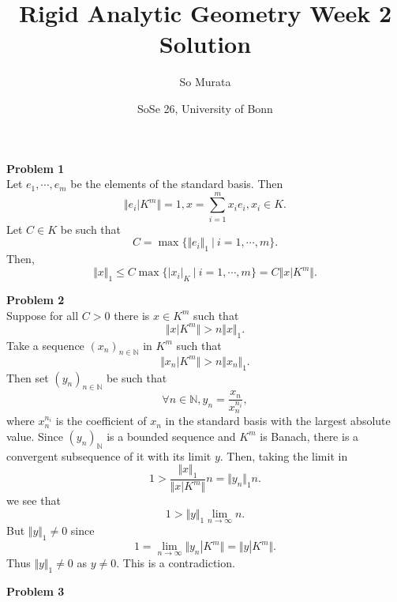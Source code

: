 \documentclass[10pt]{article}
\title{Rigid Analytic Geometry Week 2 Solution}
\author{So Murata}
\date{SoSe 26, University of Bonn}
\newcommand{\norm}[1]{\Vert #1 \Vert}
\newcommand{\N}[0]{\mathbb{N}}
\newcommand{\sep}[0]{\:|\:}
\newcommand{\ab}[1]{\vert #1 \vert}
\begin{document}
\maketitle

\par\textbf{Problem 1}\\
Let $e_1,\cdots,e_m$ be the elements of the standard basis. Then 
\begin{equation*}
    \norm{e_i|K^m}=1, x= \sum_{i=1}^m x_i e_i, x_i\in K.
\end{equation*}
Let $C\in K$ be such that 
\begin{equation*}
    C = \max\{\norm{e_i}_1\sep i=1,\cdots,m\}.
\end{equation*}
Then,
\begin{equation*}
    \norm{x}_1 \leq C\max\{\ab{x_i}_K\sep i=1,\cdots,m\} = C\norm{x|K^m}.
\end{equation*}
\par\textbf{Problem 2}\\
Suppose for all $C>0$ there is $x\in K^m$ such that 
\begin{equation*}
    \norm{x|K^m}>n\norm{x}_1.
\end{equation*}
Take a sequence $(x_n)_{n\in \N}$ in $K^m$ such that 
\begin{equation*}
    \norm{x_n|K^m}>n\norm{x_n}_1.
\end{equation*}
Then set $(y_n)_{n\in \N}$ be such that 
\begin{equation*}
    \forall n\in\N, y_n = {\frac {x_n} {x_n^{n_i}}},
\end{equation*}
where $x_n^{n_i}$ is the coefficient of $x_n$ in the standard basis with the largest absolute value. Since $(y_n)_{\N}$ is a bounded sequence and $K^m$ is Banach, there is a convergent subsequence of it with its limit $y$. Then, taking the limit in
\begin{equation*}
    1>{\frac {\norm{x}_1} {\norm{x|K^m}}}n = \norm{y_n}_1n.
\end{equation*}
we see that 
\begin{equation*}
    1>\norm{y}_1\lim_{n\to\infty}n.
\end{equation*}
But $\norm{y}_1\not=0$ since
\begin{equation*}
    1 = \lim_{n\to \infty}\norm{y_n|K^m} = \norm{y|K^m}.
\end{equation*}
Thus $\norm{y}_1\not=0$ as $y\not=0$. This is a contradiction.
\par\textbf{Problem 3}\\
\end{document}
